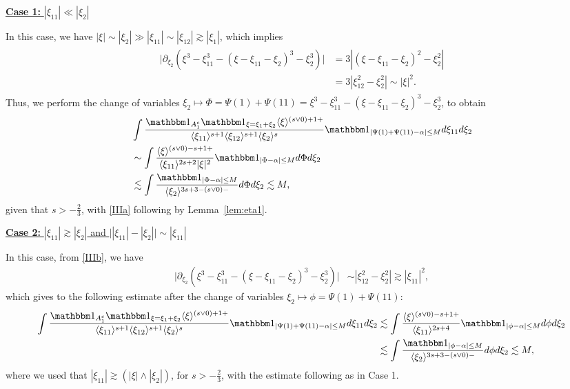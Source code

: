 \documentclass[%
11pt,  reqno]{amsart}
\newcommand{\5}{\textup{V}}
\newcommand{\noi}{\noindent}
\newcommand{\ind}{\mathbbm 1}
\newcommand{\les}{\lesssim}
\theoremstyle{remark}
\newcommand{\al}{\alpha}
\newcommand{\ges}{\gtrsim}
\newcommand{\jb}[1]
{\langle #1 \rangle}
\numberwithin{equation}{section}
\numberwithin{theorem}{section}
\begin{document}
\smallskip
\noi
\underline{\textbf{Case 1:} $|\xi_{11}| \ll |\xi_2|$}

In this case, we have $|\xi| \sim |\xi_2| \gg  |\xi_{11}| \sim |\xi_{12}| \ges |\xi_1|$, which implies
\begin{align}\label{IIIb}
\begin{split}
\big| 
\partial_{\xi_{2}}  (\xi^3 - \xi_{11}^3 - (\xi-\xi_{11}-\xi_2)^3 - \xi_2^3)
\big|
&
= 3 | (\xi-\xi_{11}-\xi_2)^2 - \xi_2^2|
\\
&
=3|\xi_{12}^2 - \xi_2^2|
\sim |\xi|^2. 
\end{split}
\end{align}
Thus, we perform the change of variables $\xi_2 \mapsto \Phi = \Psi(1) + \Psi(11) = \xi^3 - \xi^3_{11} - (\xi-\xi_{11}-\xi_2)^3 - \xi_2^3$, to obtain
\begin{align}
&
\int \frac{ \ind_{A_1^c} \ind_{\xi=\xi_1+\xi_2} \jb{\xi}^{(s\lor 0)+1 + }  }{ \jb{\xi_{11}}^{s+1  } \jb{\xi_{12}}^{s+1} \jb{\xi_{2}}^s }
\ind_{|\Psi(1) + \Psi(11) - \al| \le M}
d\xi_{11} d\xi_2
\\
&
\sim \int \frac{ \jb{\xi}^{(s\lor0)  - s +  1 + } }{ \jb{\xi_{11}}^{2s+2} |\xi|^2  } \ind_{|\Phi - \al|\le M } d\Phi d\xi_2 
\\
&
\les \int \frac{\ind_{|\Phi - \al|\le M }}{ \jb{\xi_2}^{3s+3- (s \lor 0) - } } d\Phi d\xi_2 \les M, 
\end{align}
given that $s>-\frac23$, with \eqref{IIIa} following by Lemma~\ref{lem:eta1}. 



\smallskip
\noi
\underline{\textbf{Case 2:} $|\xi_{11}| \ges |\xi_2|$ and $\big| |\xi_{11}| - |\xi_2| \big| \sim |\xi_{11}|$}

In this case, from \eqref{IIIb}, we have
\begin{align}
\big| 
\partial_{\xi_{2}}  (\xi^3 - \xi_{11}^3 - (\xi-\xi_{11}-\xi_2)^3 - \xi_2^3)
\big|
&
\sim |\xi_{12}^2 - \xi_2^2| \ges |\xi_{11}|^2,
\end{align}
which gives to the following estimate after the change of variables $\xi_{2} \mapsto \phi = \Psi(1) + \Psi(11)$:
\begin{align}
\int \frac{\ind_{A_1^c} \ind_{\xi=\xi_1+\xi_2} \jb{\xi}^{(s \lor 0 )+ 1+}}{ \jb{\xi_{11}}^{s+1} \jb{\xi_{12}}^{s+1} \jb{\xi_2}^s}
\ind_{|\Psi(1) + \Psi(11) - \al| \le M}
d\xi_{11} d\xi_2
&
\les \int \frac{\jb{\xi}^{(s\lor0) - s + 1 +} }{ \jb{\xi_{11}}^{2s+4}  } \ind_{|\phi - \al | \le M } d\phi d\xi_2
\\
&
\les \int \frac{\ind_{|\phi - \al|\le M }}{ \jb{\xi_2}^{3s + 3 -(s \lor 0)-} } d\phi d\xi_2 \les M, 
\end{align}
where we used that $|\xi_{11}| \ges (|\xi| \land |\xi_2|)$, for $s>-\frac23$, with the estimate following as in Case 1. 
\end{document}
